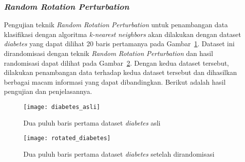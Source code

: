 \subsubsection{\textit{Random Rotation Perturbation}}
\label{sec:pengujian-klasifikasi-rrp}

Pengujian teknik \textit{Random Rotation Perturbation} untuk penambangan data klasifikasi dengan algoritma \textit{k-nearest neighbors} akan dilakukan dengan dataset \textit{diabetes} yang dapat dilihat 20 baris pertamanya pada Gambar~\ref{fig:diabetes_asli}. Dataset ini dirandomisasi dengan teknik \textit{Random Rotation Perturbation} dan hasil randomisasi dapat dilihat pada Gambar~\ref{fig:rotated_diabetes}. Dengan kedua dataset tersebut, dilakukan penambangan data terhadap kedua dataset tersebut dan dihasilkan berbagai macam informasi yang dapat dibandingkan. Berikut adalah hasil pengujian dan penjelasannya.

\begin{figure}
	\centering
	\texttt{[image: diabetes\_asli]}
	\caption{Dua puluh baris pertama dataset \textit{diabetes} asli}
	\label{fig:diabetes_asli}
\end{figure}

\begin{figure}
	\centering
	\texttt{[image: rotated\_diabetes]}
	\caption{Dua puluh baris pertama dataset \textit{diabetes} setelah dirandomisasi}
	\label{fig:rotated_diabetes}
\end{figure}

